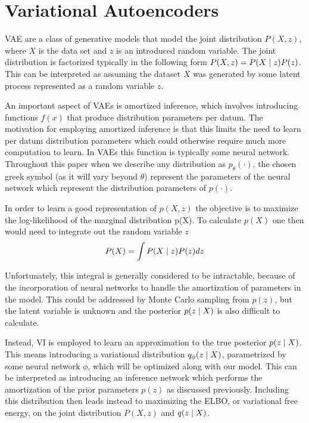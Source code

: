 \section{Variational Autoencoders}

\ac{VAE} are a class of generative models that model the joint distribution $P(X, z)$, where $X$ is the data set and $z$ is an introduced random variable. The joint distribution is factorized typically in the following form $P(X, z) = P(X\; | \;{z})P(z)$. This can be interpreted as assuming the dataset $X$ was generated by some latent process represented as a random variable $z$. 

An important aspect of \ac{VAE}s is amortized inference, which involves introducing functions $f(x)$ that produce distribution parameters per datum. The motivation for employing amortized inference is that this limits the need to learn per datum distribution parameters which could otherwise require much more computation to learn. In \ac{VAE}s this function is typically some neural network. Throughout this paper when we describe any distribution as $p_{\theta}(\cdot)$, the chosen greek symbol (as it will vary beyond $\theta$) represent the parameters of the neural network which represent the distribution parameters of $p(\cdot)$. 

In order to learn a good representation of $p(X,z)$ the objective is to maximize the log-likelihood of the marginal distribution p(X). To calculate $p(X)$ one then would need to integrate out the random variable $z$
\begin{equation}
P(X) = \int P(X \; | \;{z}) P(z) dz
\end{equation}

Unfortunately, this integral is generally considered to be intractable, because of the incorporation of neural networks to handle the amortization of parameters in the model. This could be addressed by Monte Carlo sampling from $p(z)$, but the latent variable is unknown and the posterior $p(z \; | \;{X})$ is also difficult to calculate. 

Instead, \ac{VI} is employed to learn an approximation to the true posterior $p(z \; | \;{X})$. This means introducing a variational distribution $q_{\phi}(z \; | \;{X})$, parametrized by some neural network $\phi$, which will be optimized along with our model. This can be interpreted as introducing an inference network which performs the amortization of the prior parameters $p(z)$ as discussed previously.  Including this distribution then leads instead to maximizing the \ac{ELBO}, or variational free energy, on the joint distribution $P(X, z)$ and $q(z \; | \;{X})$. 

